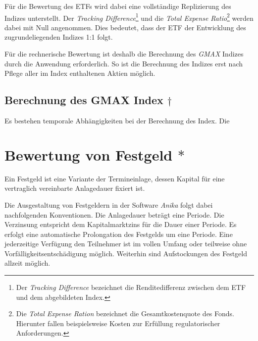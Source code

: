 \documentclass[12pt, a4paper]{article}
\begin{document}
Für die Bewertung des ETFs wird dabei eine vollständige Replizierung des Indizes unterstellt.
Der \textit{Tracking Difference}\footnote{Der \textit{Tracking Difference} bezeichnet die Renditedifferenz zwischen dem ETF und dem abgebildeten Index.} und die \textit{Total Expense Ratio}\footnote{Die \textit{Total Expense Ration} bezeichnet die Gesamtkostenquote des Fonds. Hierunter fallen beispielsweise Kosten zur Erfüllung regulatorischer Anforderungen.} werden dabei mit Null angenommen.
Dies bedeutet, dass der ETF der Entwicklung des zugrundeliegenden Indizes 1:1 folgt.


Für die rechnerische Bewertung ist deshalb die Berechnung des \textit{GMAX} Indizes durch die Anwendung erforderlich. So ist die Berechnung des Indizes erst nach Pflege aller im Index enthaltenen Aktien möglich.

\subsection{Berechnung des {GMAX} Index $\dagger$}

Es bestehen temporale Abhängigkeiten bei der Berechnung des Index. Die 



\section{Bewertung von Festgeld $\ast$}
\label{sec:bewertung_von_festgeldern}

Ein Festgeld ist eine Variante der Termineinlage, dessen Kapital für eine vertraglich vereinbarte Anlagedauer fixiert ist.

Die Ausgestaltung von Festgeldern in der Software \textit{Anika} folgt dabei nachfolgenden Konventionen. Die Anlagedauer beträgt eine Periode.
Die Verzinsung entspricht dem Kapitalmarktzins für die Dauer einer Periode. Es erfolgt eine automatische Prolongation des Festgelds um eine Periode. Eine jederzeitige Verfügung den Teilnehmer ist im vollen Umfang oder teilweise ohne Vorfälligkeitsentschädigung möglich.
Weiterhin sind Aufstockungen des Festgeld allzeit möglich.
\end{document}
